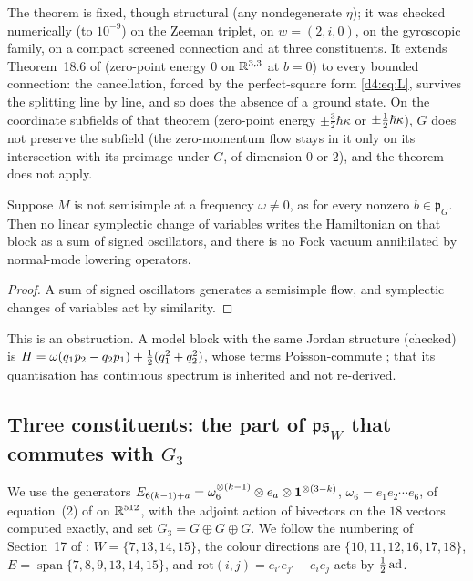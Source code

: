 The theorem is fixed, though structural (any nondegenerate $\eta$); it was checked numerically (to $10^{-9}$) on the Zeeman triplet, on
$w=(2,i,0)$, on the gyroscopic family, on a compact screened connection and at three constituents. It extends Theorem~18.6 of \cite{ES17}
(zero-point energy $0$ on $\mathbb{R}^{3,3}$ at $b=0$) to every bounded connection: the cancellation, forced by the perfect-square form \eqref{d4:eq:L},
survives the splitting line by line, and so does the absence of a ground state. On the coordinate subfields of that theorem (zero-point energy $\pm\tfrac32\hbar\kappa$ or
$\pm\tfrac12\hbar\kappa$), $G$ does not preserve the subfield (the zero-momentum flow stays in it only on its intersection with its preimage under
$G$, of dimension $0$ or $2$), and the theorem does not apply.

\begin{corollary}
\label{d4:cor:nofock}
Suppose $M$ is not semisimple at a frequency $\omega\neq0$, as for every nonzero $b\in\mathfrak p_G$. Then no linear symplectic change of
variables writes the Hamiltonian on that block as a sum of signed oscillators, and there is no Fock vacuum annihilated by normal-mode
lowering operators.
\end{corollary}

\begin{proof}
A sum of signed oscillators generates a semisimple flow, and symplectic changes of variables act by similarity.
\end{proof}

\noindent This is an obstruction. A model block with the same Jordan structure (checked) is $H=\omega(q_1p_2-q_2p_1)+\tfrac12(q_1^2+q_2^2)$, whose terms
Poisson-commute \cite{Williamson36}; that its quantisation has continuous spectrum is inherited and not re-derived.

\subsection{\texorpdfstring{Three constituents: the part of $\mathfrak{ps}_W$ that commutes with $G_3$}{Three constituents: the part of ps\_W that commutes with G3}}
\label{d4:sec:three}

We use the generators $E_{6(k-1)+a}=\omega_6^{\otimes(k-1)}\otimes e_a\otimes\mathbf 1^{\otimes(3-k)}$, $\omega_6=e_1e_2\cdots e_6$, of equation~(2) of \cite{ES17} on
$\mathbb{R}^{512}$, with the adjoint action of bivectors on the $18$ vectors computed exactly, and set $G_3=G\oplus G\oplus G$. We follow the numbering of
Section~17 of \cite{ES17}: $W=\{7,13,14,15\}$, the colour directions are $\{10,11,12,16,17,18\}$, $E=\operatorname{span}\{7,8,9,13,14,15\}$, and
$\mathrm{rot}(i,j)=e_{i'}e_{j'}-e_ie_j$ acts by $\tfrac12\operatorname{ad}$.

